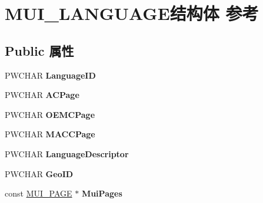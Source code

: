 \hypertarget{struct_m_u_i___l_a_n_g_u_a_g_e}{}\section{M\+U\+I\+\_\+\+L\+A\+N\+G\+U\+A\+G\+E结构体 参考}
\label{struct_m_u_i___l_a_n_g_u_a_g_e}
\subsection*{Public 属性}
\begin{DoxyCompactItemize}
\item 
\mbox{\label{struct_m_u_i___l_a_n_g_u_a_g_e_aacf8a859663bcde64baeb71c9108f917}} 
P\+W\+C\+H\+AR {\bfseries Language\+ID}
\item 
\mbox{\label{struct_m_u_i___l_a_n_g_u_a_g_e_a0ed4373cacdd5f11219784cd97088aa5}} 
P\+W\+C\+H\+AR {\bfseries A\+C\+Page}
\item 
\mbox{\label{struct_m_u_i___l_a_n_g_u_a_g_e_aa4263798498d6a6c084434671d8c0016}} 
P\+W\+C\+H\+AR {\bfseries O\+E\+M\+C\+Page}
\item 
\mbox{\label{struct_m_u_i___l_a_n_g_u_a_g_e_a13bbaab0129b9194df21da3a800606fd}} 
P\+W\+C\+H\+AR {\bfseries M\+A\+C\+C\+Page}
\item 
\mbox{\label{struct_m_u_i___l_a_n_g_u_a_g_e_a361bf2b4ce2a19be4a369997574c6974}} 
P\+W\+C\+H\+AR {\bfseries Language\+Descriptor}
\item 
\mbox{\label{struct_m_u_i___l_a_n_g_u_a_g_e_a5778ef418696533cf5ee0dea813ee1ae}} 
P\+W\+C\+H\+AR {\bfseries Geo\+ID}
\item 
\mbox{\label{struct_m_u_i___l_a_n_g_u_a_g_e_aa2ef5b4e0516760c6e3ca36f8b32dd7f}} 
const \hyperlink{struct_m_u_i___p_a_g_e}{M\+U\+I\+\_\+\+P\+A\+GE} $\ast$ {\bfseries Mui\+Pages}
\item 
\mbox{\label{struct_m_u_i___l_a_n_g_u_a_g_e_a935594b45a57b4ee933038203bd467b9}} 

\end{DoxyCompactItemize}
